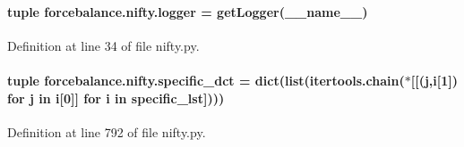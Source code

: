 \hypertarget{namespaceforcebalance_1_1nifty_a1859e992ed983dbbcc8093fdd19710e7}{
\paragraph[{logger}]{\setlength{\rightskip}{0pt plus 5cm}tuple forcebalance.\-nifty.\-logger = get\-Logger(\-\_\-\-\_\-name\-\_\-\-\_\-)}}\label{namespaceforcebalance_1_1nifty_a1859e992ed983dbbcc8093fdd19710e7}


Definition at line 34 of file nifty.\-py.

\hypertarget{namespaceforcebalance_1_1nifty_ab652c941890b0f378100433699c8d255}{
\paragraph[{specific\-\_\-dct}]{\setlength{\rightskip}{0pt plus 5cm}tuple forcebalance.\-nifty.\-specific\-\_\-dct = dict(list(itertools.\-chain($\ast$\mbox{[}\mbox{[}(j,i\mbox{[}1\mbox{]}) for j in i\mbox{[}0\mbox{]}\mbox{]} for i in {\bf specific\-\_\-lst}\mbox{]})))}}\label{namespaceforcebalance_1_1nifty_ab652c941890b0f378100433699c8d255}


Definition at line 792 of file nifty.\-py.


